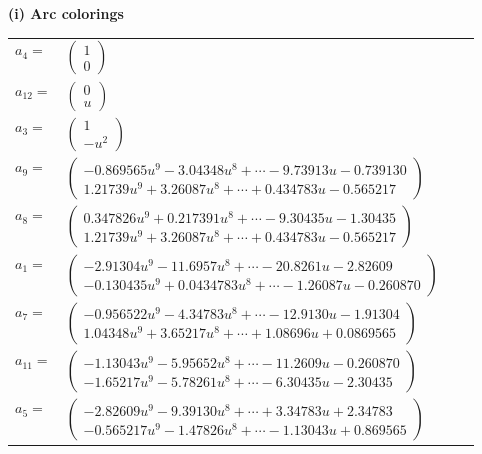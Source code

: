 \documentclass[1p]{elsarticle_modified}
\theoremstyle{definition}
\begin{document}
\flushleft \textbf{(i) Arc colorings}\\
\begin{tabular}{m{7pt} m{180pt} m{7pt} m{180pt} }
\flushright $a_{4}=$&$\begin{pmatrix}1\\0\end{pmatrix}$ \\
\flushright $a_{12}=$&$\begin{pmatrix}0\\u\end{pmatrix}$ \\
\flushright $a_{3}=$&$\begin{pmatrix}1\\- u^2\end{pmatrix}$ \\
\flushright $a_{9}=$&$\begin{pmatrix}-0.869565 u^{9}-3.04348 u^{8}+\cdots-9.73913 u-0.739130\\1.21739 u^{9}+3.26087 u^{8}+\cdots+0.434783 u-0.565217\end{pmatrix}$ \\
\flushright $a_{8}=$&$\begin{pmatrix}0.347826 u^{9}+0.217391 u^{8}+\cdots-9.30435 u-1.30435\\1.21739 u^{9}+3.26087 u^{8}+\cdots+0.434783 u-0.565217\end{pmatrix}$ \\
\flushright $a_{1}=$&$\begin{pmatrix}-2.91304 u^{9}-11.6957 u^{8}+\cdots-20.8261 u-2.82609\\-0.130435 u^{9}+0.0434783 u^{8}+\cdots-1.26087 u-0.260870\end{pmatrix}$ \\
\flushright $a_{7}=$&$\begin{pmatrix}-0.956522 u^{9}-4.34783 u^{8}+\cdots-12.9130 u-1.91304\\1.04348 u^{9}+3.65217 u^{8}+\cdots+1.08696 u+0.0869565\end{pmatrix}$ \\
\flushright $a_{11}=$&$\begin{pmatrix}-1.13043 u^{9}-5.95652 u^{8}+\cdots-11.2609 u-0.260870\\-1.65217 u^{9}-5.78261 u^{8}+\cdots-6.30435 u-2.30435\end{pmatrix}$ \\
\flushright $a_{5}=$&$\begin{pmatrix}-2.82609 u^{9}-9.39130 u^{8}+\cdots+3.34783 u+2.34783\\-0.565217 u^{9}-1.47826 u^{8}+\cdots-1.13043 u+0.869565\end{pmatrix}$ \\

\end{tabular}
\end{document}
